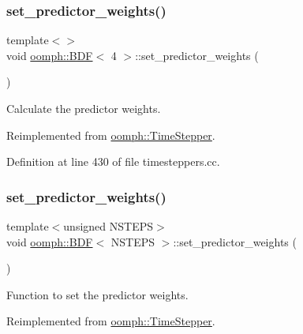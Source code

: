 \subsubsection{\texorpdfstring{set\+\_\+predictor\+\_\+weights()}{set\_predictor\_weights()}\hspace{0.1cm}{\footnotesize\ttfamily [3/4]}}
{\footnotesize\ttfamily template$<$$>$ \\
void \hyperlink{classoomph_1_1BDF}{oomph\+::\+B\+DF}$<$ 4 $>$\+::set\+\_\+predictor\+\_\+weights (\begin{DoxyParamCaption}{ }\end{DoxyParamCaption})\hspace{0.3cm}{\ttfamily [virtual]}}



Calculate the predictor weights. 



Reimplemented from \hyperlink{classoomph_1_1TimeStepper_a2dfb949155ba433066fd69dc427ba1ce}{oomph\+::\+Time\+Stepper}.



Definition at line 430 of file timesteppers.\+cc.

\mbox{\label{classoomph_1_1BDF_a9c5b309e589b0e0da14d912556e5cc4a}} 
\subsubsection{\texorpdfstring{set\+\_\+predictor\+\_\+weights()}{set\_predictor\_weights()}\hspace{0.1cm}{\footnotesize\ttfamily [4/4]}}
{\footnotesize\ttfamily template$<$unsigned N\+S\+T\+E\+PS$>$ \\
void \hyperlink{classoomph_1_1BDF}{oomph\+::\+B\+DF}$<$ N\+S\+T\+E\+PS $>$\+::set\+\_\+predictor\+\_\+weights (\begin{DoxyParamCaption}{ }\end{DoxyParamCaption})\hspace{0.3cm}{\ttfamily [virtual]}}



Function to set the predictor weights. 



Reimplemented from \hyperlink{classoomph_1_1TimeStepper_a2dfb949155ba433066fd69dc427ba1ce}{oomph\+::\+Time\+Stepper}.

